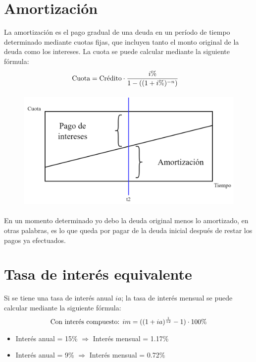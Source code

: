 \documentclass{templateNote}
\begin{document}
\section{Amortización}
\noindent La amortización es el pago gradual de una deuda en un período de tiempo determinado mediante cuotas fijas, que incluyen tanto el monto original de la deuda como los intereses. La cuota se puede calcular mediante la siguiente fórmula:
\begin{align*}
    \textnormal{Cuota} &= \textnormal{Crédito} \cdot \frac{i\%}{1-((1+i\%)^{-n})}
\end{align*}
\begin{figure}[H]
    \centering
    \includegraphics[height=6cm]{img/amortiz.png}
\end{figure}

\begin{tcolorbox}[colback=orange!10!white,colframe=orange!60!black,title=Observación]
    En un momento determinado yo debo la deuda original menos lo amortizado, en otras palabras, es lo que queda por pagar de la deuda inicial después de restar los pagos ya efectuados.
\end{tcolorbox}
\newpage

\section{Tasa de interés equivalente}
\noindent Si se tiene una tasa de interés anual $ia$; la tasa de interés mensual se puede calcular mediante la siguiente fórmula:
\begin{align*}
    \textnormal{Con interés compuesto: }im &= ((1 + ia)^{\frac{1}{12}} - 1) \cdot 100\%\\
\end{align*}

\begin{tcolorbox}[colback=blue!10!white,colframe=blue!60!black,title=Ejercicios]
    \begin{itemize}
        \item Interés anual = 15\% $\Rightarrow$ Interés mensual = 1.17\%
        \item Interés anual = 9\% $\Rightarrow$ Interés mensual = 0.72\%
    \end{itemize}
\end{tcolorbox}
\end{document}
